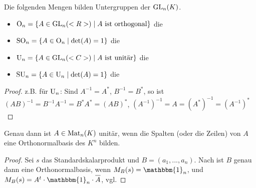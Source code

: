 \begin{proposition}
	Die folgenden Mengen bilden Untergruppen der $\operatorname{GL}_n(K)$.
	\begin{itemize}
		\item $\operatorname{O}_n=\{A\in\operatorname{GL}_n(<R>)\mid A\text{ ist orthogonal}\}$ die 
		\item $\operatorname{SO}_n=\{A\in \operatorname{O}_n\mid \det(A)=1\}$ die 
		\item $\operatorname{U}_n=\{A\in\operatorname{GL}_n(<C>)\mid A\text{ ist unitär}\}$ die 
		\item $\operatorname{SU}_n=\{A\in \operatorname{U}_n\mid \det(A)=1\}$ die 
	\end{itemize}
\end{proposition}
\begin{proof}
	z.B. für $\operatorname{U}_n$: Sind $A^{-1}=A^*$, $B^{-1}=B^*$, so ist $(AB)^{-1}=B^{-1}A^{-1}=B^*A^*=(AB)^*$, $(A^{-1})^{-1}=A=(A^*)^{-1}=(A^{-1})^*$
\end{proof}

\begin{proposition}
	Genau dann ist $A\in\operatorname{Mat}_n(K)$ unitär, wenn die Spalten (oder die Zeilen) von $A$ eine Orthonormalbasis des $K^n$ bilden. 
\end{proposition}
\begin{proof}
	Sei $s$ das Standardskalarprodukt und $B=(a_1,...,a_n)$. Nach  ist $B$ genau dann eine Orthonormalbasis, wenn $M_B(s)=\mathbbm{1}_n$, und $M_B(s)=A^t\cdot\mathbbm{1}_n\cdot\overline{A}$, vgl. 
\end{proof}
